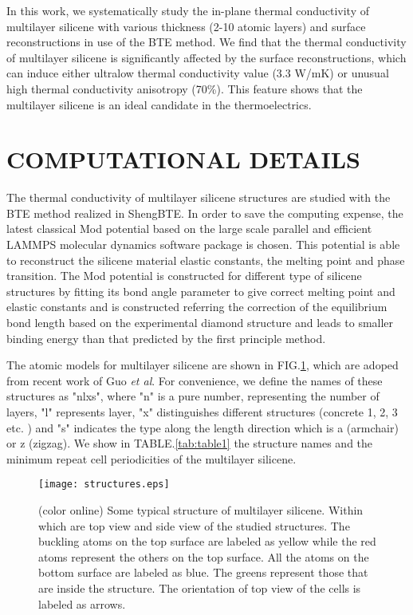 \documentclass[aps,prb,twocolumn,showpacs,amsmath,amssymb]{revtex4-1}
\begin{document}
In this work, we systematically study the in-plane thermal conductivity of multilayer silicene with various thickness  (2-10 atomic layers) and surface reconstructions in use of  the BTE method.  We find that the thermal conductivity of multilayer silicene is significantly affected by the surface reconstructions, which can induce  either ultralow thermal conductivity value ($3.3$ W/mK) or unusual high thermal conductivity anisotropy (70\%).  This feature shows that the  multilayer silicene is an ideal candidate in the thermoelectrics.


\section{COMPUTATIONAL DETAILS}

The thermal conductivity of multilayer silicene structures are studied with the BTE method realized in ShengBTE\cite{Li2014}. In order to save the computing expense, the latest classical Mod potential\cite{Parks2007} based on the large scale parallel and efficient LAMMPS molecular dynamics software package is chosen\cite{Kumagai2007Development}. This potential is able to reconstruct the silicene material elastic constants, the melting point and phase transition. The Mod potential is constructed for different type of silicene structures by fitting its bond angle parameter to give correct melting point and elastic constants and is constructed referring the correction of the equilibrium bond length based on the experimental diamond structure and leads to smaller binding energy than that predicted by the first principle method.

The atomic models for multilayer silicene are shown in FIG.\ref{fig:structures}, which are adoped from recent work of Guo \emph{et al}\cite{Guo2015Structural}. For convenience, we define the names of these structures as "nlxs", where "n" is a pure number, representing the number of layers, "l" represents layer, "x" distinguishes different structures (concrete 1, 2, 3 etc. ) and "s" indicates the type along the length direction which is a (armchair) or z (zigzag). We show in TABLE.\ref{tab:table1} the structure names and  the minimum repeat cell periodicities of the multilayer silicene.

\begin{figure}[b]
  \texttt{[image: structures.eps]}
  \caption{\label{fig:structures}  (color online) Some typical structure of multilayer silicene. Within which  are top view and side view of the studied structures. The buckling atoms on the top surface are labeled as yellow while the red atoms represent the others on the top surface. All the atoms on the bottom surface are labeled as blue. The greens represent those that are inside the structure. The orientation of top view of the cells is labeled as arrows.}
\end{figure}
\end{document}
